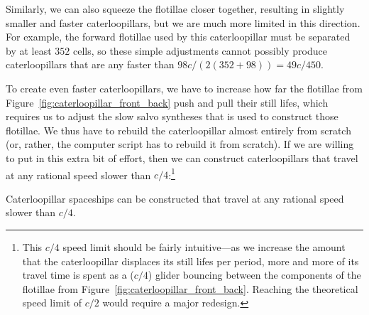 Similarly, we can also squeeze the flotillae closer together, resulting in slightly smaller and faster caterloopillars, but we are much more limited in this direction. For example, the forward flotillae used by this caterloopillar must be separated by at least $352$ cells, so these simple adjustments cannot possibly produce caterloopillars that are any faster than $98c/(2(352 + 98)) = 49c/450$.

To create even faster caterloopillars, we have to increase how far the flotillae from Figure~\ref{fig:caterloopillar_front_back} push and pull their still lifes, which requires us to adjust the slow salvo syntheses that is used to construct those flotillae. We thus have to rebuild the caterloopillar almost entirely from scratch (or, rather, the computer script has to rebuild it from scratch). If we are willing to put in this extra bit of effort, then we can construct caterloopillars that travel at any rational speed slower than $c/4$:\footnote{This $c/4$ speed limit should be fairly intuitive---as we increase the amount that the caterloopillar displaces its still lifes per period, more and more of its travel time is spent as a ($c/4$) glider bouncing between the components of the flotillae from Figure~\ref{fig:caterloopillar_front_back}. Reaching the theoretical speed limit of $c/2$ would require a major redesign.}

\begin{theorem}\label{thm:caterloopillar_speeds}
	Caterloopillar spaceships can be constructed that travel at any rational speed slower than $c/4$.
\end{theorem}

